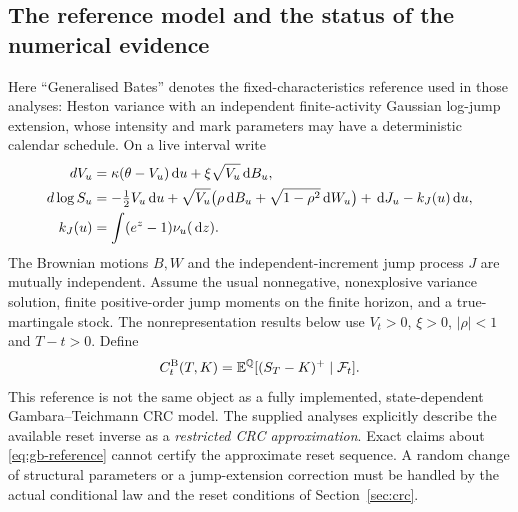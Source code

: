 \documentclass[11pt,a4paper]{article}
\numberwithin{equation}{section}
\theoremstyle{definition}\newtheorem{definition}[theorem]{Definition}
\theoremstyle{remark}\newtheorem{remark}[theorem]{Remark}
\newcommand{\Q}{\mathbb Q}\newcommand{\Pp}{\mathbb P}
\newcommand{\E}{\mathbb E}\newcommand{\R}{\mathbb R}
\newcommand{\F}{\mathcal F}\newcommand{\G}{\mathcal G}
\newcommand{\dd}{\,\mathrm d}\newcommand{\dt}{\,\mathrm dt}
\begin{document}
\subsection{The reference model and the status of the numerical evidence}
\label{sec:bates-scope}
Here ``Generalised Bates'' denotes the fixed-characteristics reference used in those analyses: Heston variance with an independent finite-activity Gaussian log-jump extension, whose intensity and mark parameters may have a deterministic calendar schedule. On a live interval write
\begin{align}
 dV_u&=\kappa(\theta-V_u)\dd u+\xi\sqrt{V_u}\dd B_u,\notag\\
 d\log S_u&=-\tfrac12V_u\dd u
 +\sqrt{V_u}\bigl(\rho\dd B_u+\sqrt{1-\rho^2}\dd W_u\bigr)
 +\dd J_u-k_J(u)\dd u,\label{eq:gb-reference}\\
 k_J(u)&=\int(e^z-1)\nu_u(\dd z).\notag
\end{align}
The Brownian motions $B,W$ and the independent-increment jump process $J$ are mutually independent. Assume the usual nonnegative, nonexplosive variance solution, finite positive-order jump moments on the finite horizon, and a true-martingale stock. The nonrepresentation results below use $V_t>0$, $\xi>0$, $|\rho|<1$ and $T-t>0$. Define
\[
 C_t^{\rm B}(T,K)=\E^{\Q}[(S_T-K)^+\mid\F_t].
\]
This reference is not the same object as a fully implemented, state-dependent Gambara--Teichmann CRC model. The supplied analyses explicitly describe the available reset inverse as a \emph{restricted CRC approximation}. Exact claims about \eqref{eq:gb-reference} cannot certify the approximate reset sequence. A random change of structural parameters or a jump-extension correction must be handled by the actual conditional law and the reset conditions of Section~\ref{sec:crc}.
\end{document}
